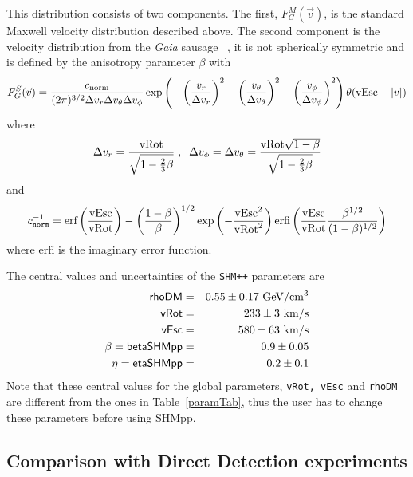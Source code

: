 \documentclass[12pt,a4paper]{article}
\begin{document}
This distribution consists of two components. The first, $F_G^M(\vec{v})$,   
is  the standard Maxwell velocity distribution described above.   The second component  is the velocity distribution from the {\it Gaia} sausage ~\cite{Belokurov_2018,Myeong:2018kfh}, it  is not spherically symmetric and is defined by the
anisotropy parameter $\beta$ with
\begin{equation}
 F_G^S(\vec{v})=   \frac{c_{\rm{norm}} }{(2\pi)^{3/2} \Delta v_r \Delta v_\theta\Delta v_\phi}
  \exp\left( -\left( \frac{v_r}{\Delta v_r}\right)^2 
 -\left( \frac{v_\theta}{\Delta v_\theta}\right)^2  -\left( \frac{v_\phi}{\Delta v_\phi}\right)^2   \right)
\theta(\mbox{vEsc} -|\vec{v}|)
\end{equation}
where  
\begin{equation}
\Delta v_r= \frac{\rm{vRot}}{\sqrt{1-\frac{2}{3}\beta}}\;,\;\; \Delta v_\phi=\Delta v_\theta=\frac{\rm{vRot} \sqrt{1-\beta}}{\sqrt{1-\frac{2}{3}\beta}} 
\end{equation}  
and 
\begin{equation}
c_{\tt norm}^{-1}= {\mbox{erf}}\left(\frac{\mbox{vEsc}}{\rm{vRot}} \right) - \left( \frac{1-\beta}{\beta} \right)^{1/2}   \exp\left( -\frac{\mbox{vEsc}^2}{\rm{vRot}^2}\right) 
{\mbox{erfi}}\left( \frac{\mbox{vEsc}}{\rm{vRot}}\frac{\beta^{1/2}}{(1-\beta)^{1/2}}        \right)
\end{equation}  
where ${\mbox{erfi}}$ is the imaginary error function.
  
The central values  and uncertainties   of   the {\tt SHM++} parameters are  
\begin{eqnarray}
\nonumber 
\textsf{rhoDM} &=&0.55\pm 0.17 ~{\rm GeV}/{\rm cm}^3\\
\nonumber
\textsf{vRot}&=& 233\pm 3 ~{\rm km/s}\\
\nonumber
\textsf{vEsc}&=& 580\pm 63~ {\rm km/s}\\
\nonumber
 \beta=\textsf{betaSHMpp} &=&0.9\pm 0.05\\
\eta= \textsf{etaSHMpp} &=& 0.2\pm 0.1 
\label{eq:SHMpp} 
\end{eqnarray}
\noindent
Note that these central values for the global parameters, {\tt vRot, vEsc} and {\tt rhoDM}   
are different from  the  ones in Table~\ref{paramTab}, thus the user has  to change these parameters before  using SHMpp.
 






\subsection{Comparison with Direct Detection experiments} 
\label{DDexp}
\end{document}
